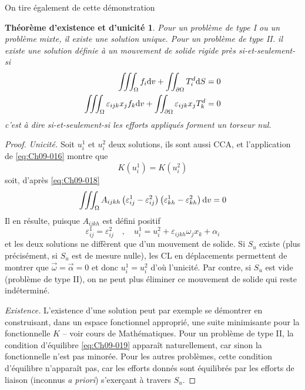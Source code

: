 On tire également de cette démonstration 
\newtheorem*{ThEU}{Théorème d'existence et d'unicité}
\begin{ThEU}
    Pour un problème de type I ou un problème mixte, il existe une solution unique.
    Pour un problème de type II. il existe une solution définie à un mouvement de solide rigide près si-et-seulement-si
    \begin{equation}
        \begin{split}
            \iiint_{\Omega} f_i \mathrm{d} v + \iint_{\partial \Omega} T_i^d \mathrm{d} S = 0 \\
            \iiint_{\Omega} \varepsilon_{ijk} x_{j} f_k \mathrm{d} v + \iint_{\partial \Omega} \varepsilon_{ijk} x_j T_k^d = 0
        \end{split}
        \label{eq:Ch09-019}
    \end{equation}
    c'est à dire si-et-seulement-si les efforts appliqués forment un torseur nul. 
\end{ThEU}
\begin{proof}
    \textit{Unicité.}
    Soit $u_i^1$ et $u_i^2$ deux solutions, ils sont aussi CCA, et l'application de \eqref{eq:Ch09-016} montre que 
    \begin{displaymath}
        K\left( u_i^1 \right) = K \left( u_i^2 \right)
    \end{displaymath}
    soit, d'après \eqref{eq:Ch09-018}
    \begin{eqnarray}
        \iiint_{\Omega} A_{ijkh} \left( \varepsilon_{ij}^1 - \varepsilon_{ij}^2 \right) \left( \varepsilon_{kh}^1 - \varepsilon_{kh}^2 \right) \mathrm{d} v = 0
        \label{eq:Ch09-020}
    \end{eqnarray}
    Il en résulte, puisque $A_{ijkh}$ est défini positif 
    \begin{equation}
        \varepsilon_{ij}^1 = \varepsilon_{ij}^2 \quad,\quad u_i^1 = u_i^2 + \varepsilon_{ijkh} \omega_j x_k + \alpha_i
        \label{eq:Ch09-021}
    \end{equation}
    et les deux solutions ne diffèrent que d'un mouvement de solide.
    Si $S_u$ existe (plus précisément, si $S_u$ est de mesure nulle), les CL en déplacements permettent de montrer que $\vec{\omega} = \vec{\alpha} = 0$ 
et donc $u_i^1 = u_i^2$ d'où l'unicité. 
    Par contre, si $S_u$ est vide (problème de type II), on ne peut plus éliminer ce mouvement de solide qui reste indéterminé.

    \textit{Existence.}
    L'existence d'une solution peut par exemple se démontrer en construisant, dans un espace fonctionnel approprié, une suite minimisante pour la fonctionnelle $K$ -- voir cours de Mathématiques.
    Pour un problème de type II, la condition d'équilibre \eqref{eq:Ch09-019} apparaît naturellement, car sinon la fonctionnelle n'est pas minorée. 
    Pour les autres problèmes, cette condition d'équilibre n'apparaît pas, car les efforts donnés sont équilibrés par les efforts de liaison (inconnus \textit{a priori}) s'exerçant à travers $S_u$.
\end{proof}

